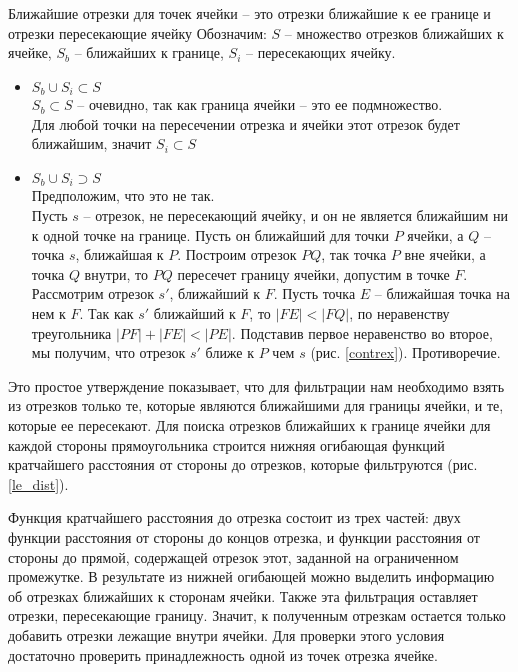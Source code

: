 {\prop\label{cl_segs}
Ближайшие отрезки для точек ячейки – это отрезки ближайшие к ее границе и отрезки пересекающие ячейку}
\proof Обозначим: $S$ -- множество отрезков ближайших к ячейке, $S_b$ -- ближайших к границе, $S_i$ --
пересекающих ячейку.
\begin{itemize}
\item $S_b \cup S_i \subset S$ \\
$S_b \subset S$ -- очевидно, так как граница ячейки -- это ее подмножество.\\
Для любой точки на пересечении отрезка и ячейки этот отрезок будет
ближайшим, значит $S_i \subset S$
\item $S_b \cup S_i \supset S$ \\
Предположим, что это не так.\\Пусть $s$ -- отрезок, не пересекающий
ячейку, и он не является ближайшим ни к одной точке на границе. Пусть
он ближайший для точки $P$ ячейки, а $Q$ -- точка $s$, ближайшая к $P$.
Построим отрезок $PQ$, так точка $P$ вне ячейки, а точка $Q$ внутри, то $PQ$
пересечет границу ячейки, допустим в точке $F$. Рассмотрим отрезок $s'$,
ближайший к $F$. Пусть точка $E$ -- ближайшая точка на нем к $F$.
Так как $s'$ ближайший к $F$, то $|FE| < |FQ|$, по неравенству треугольника $|PF|
+ |FE| < |PE|$. Подставив первое неравенство во второе, мы получим, что
отрезок $s'$ ближе к $P$ чем $s$ (рис. \ref{contrex}). Противоречие.
\end{itemize}

Это простое утверждение показывает, что для фильтрации нам
необходимо взять из отрезков только те, которые являются ближайшими для
границы ячейки, и те, которые ее пересекают.
Для поиска отрезков ближайших к границе ячейки для каждой стороны
прямоугольника строится нижняя огибающая функций кратчайшего расстояния от
стороны до отрезков, которые фильтруются (рис. \ref{le_dist}).

Функция кратчайшего расстояния до отрезка состоит из трех частей: двух функции расстояния от
стороны до концов отрезка, и функции расстояния от стороны до прямой,
содержащей отрезок этот, заданной на ограниченном промежутке. В результате
из нижней огибающей можно выделить информацию об отрезках ближайших к
сторонам ячейки. Также эта фильтрация оставляет отрезки, пересекающие
границу. Значит, к полученным отрезкам остается только добавить отрезки
лежащие внутри ячейки. Для проверки этого условия достаточно проверить
принадлежность одной из точек отрезка ячейке.

